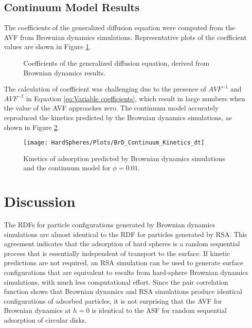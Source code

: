 \subsection{Continuum Model Results}

The coefficients of the generalized diffusion equation were computed
from the AVF from Brownian dynamics simulations. Representative plots
of the coefficient values are shown in Figure \ref{fig:Coefficient Plots}.%
\begin{figure}[H]

\caption{\label{fig:Coefficient Plots}Coefficients of the generalized diffusion
equation, derived from Brownian dynamics results.}
%
\end{figure}
 The calculation of coefficient was challenging due to the presence
of $AVF^{-1}$ and $AVF^{-2}$ in Equation \ref{eq:Variable coefficients},
which result in large numbers when the value of the AVF approaches
zero. The continuum model accurately reproduced the kinetics predicted
by the Brownian dynamics simulations, as shown in Figure \ref{fig:Kinetics CFD BrD}.%
\begin{figure}
\texttt{[image: HardSpheres/Plots/BrD\_Continuum\_Kinetics\_dt]}

\caption{\label{fig:Kinetics CFD BrD}Kinetics of adsorption predicted by Brownian
dynamics simulations and the continuum model for $\phi=0.01$.}
%
\end{figure}



\section{Discussion}

The RDFs for particle configurations generated by Brownian dynamics
simulations are almost identical to the RDF for particles generated
by RSA. This agreement indicates that the adsorption of hard spheres
is a random sequential process that is essentially independent of
transport to the surface. If kinetic predictions are not required,
an RSA simulation can be used to generate surface configurations that
are equivalent to results from hard-sphere Brownian dynamics simulations,
with much less computational effort. Since the pair correlation function
shows that Brownian dynamics and RSA simulations produce identical
configurations of adsorbed particles, it is not surprising that the
AVF for Brownian dynamics at $h=0$ is identical to the ASF for random
sequential adsorption of circular disks.

